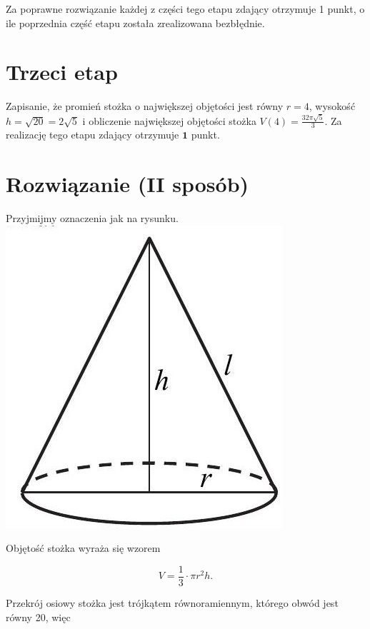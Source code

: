 \documentclass[10pt]{article}
\begin{document}
Za poprawne rozwiązanie każdej z części tego etapu zdający otrzymuje 1 punkt, o ile poprzednia część etapu została zrealizowana bezbłędnie.

\section*{Trzeci etap}
Zapisanie, że promień stożka o największej objętości jest równy $r=4$, wysokość $h=\sqrt{20}=2 \sqrt{5}$ i obliczenie największej objętości stożka $V(4)=\frac{32 \pi \sqrt{5}}{3}$. Za realizację tego etapu zdający otrzymuje $\mathbf{1}$ punkt.

\section*{Rozwiązanie (II sposób)}
Przyjmijmy oznaczenia jak na rysunku.\\
\includegraphics[max width=\textwidth, center]{2025_02_07_f5f4e8f37e6baab02e47g-34}

Objętość stożka wyraża się wzorem

$$
V=\frac{1}{3} \cdot \pi r^{2} h .
$$

Przekrój osiowy stożka jest trójkątem równoramiennym, którego obwód jest równy 20, więc
\end{document}
